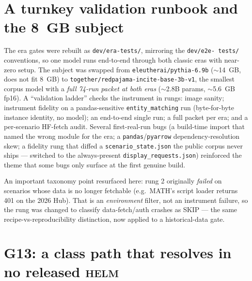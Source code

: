 \documentclass[11pt]{report}
\newcommand{\code}[1]{\texttt{#1}}
\newcommand{\file}[1]{\texttt{#1}}
\begin{document}
\section{A turnkey validation runbook and the 8~GB subject}

The era gates were rebuilt as \code{dev/era-tests/}, mirroring the \code{dev/e2e-
tests/} conventions, so one model runs end-to-end through both classic eras with
near-zero setup. The subject was swapped from \code{eleutherai/pythia-6.9b}
($\sim$14~GB, does not fit 8~GB) to \code{together/redpajama-incite-base-3b-v1},
the smallest corpus model with a \emph{full 74-run packet at both eras}
($\sim$2.8B params, $\sim$5.6~GB fp16). A ``validation ladder'' checks the
instrument in rungs: image sanity; instrument fidelity on a pandas-sensitive
\code{entity\_matching} run (byte-for-byte instance identity, no model); an
end-to-end single run; a full packet per era; and a per-scenario HF-fetch audit.
Several first-real-run bugs (a build-time import that named the wrong module for
the era; a \code{pandas}/\code{pyarrow} dependency-resolution skew; a fidelity rung
that diffed a \file{scenario\_state.json} the public corpus never ships --- switched
to the always-present \file{display\_requests.json}) reinforced the theme that
some bugs only surface at the first genuine build.

An important taxonomy point resurfaced here: rung 2 originally \emph{failed} on
scenarios whose data is no longer fetchable (e.g.\ MATH's script loader returns 401
on the 2026 Hub). That is an \emph{environment} filter, not an instrument failure,
so the rung was changed to classify data-fetch/auth crashes as SKIP --- the same
recipe-vs-reproducibility distinction, now applied to a historical-data gate.

\section{G13: a class path that resolves in no released \textsc{helm}}
\label{sec:g13}
\end{document}

